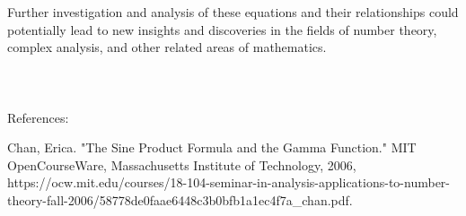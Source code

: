 \documentclass{article}
\begin{document}
Further investigation and analysis of these equations and their relationships could potentially lead to new insights and discoveries in the fields of number theory, complex analysis, and other related areas of mathematics. \\
\\
\\
\\

References:

Chan, Erica. "The Sine Product Formula and the Gamma Function." MIT OpenCourseWare, Massachusetts Institute of Technology, 2006, https://ocw.mit.edu/courses/18-104-seminar-in-analysis-applications-to-number-theory-fall-2006/58778de0faae6448c3b0bfb1a1ec4f7a_chan.pdf.
\end{document}
